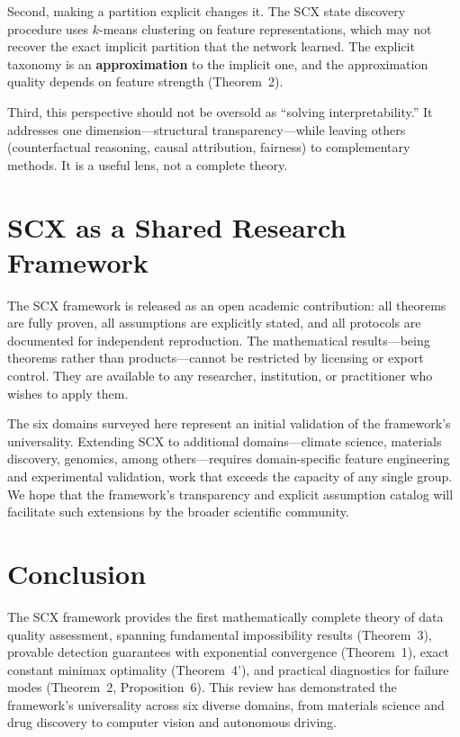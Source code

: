 \documentclass[twocolumn]{article}
\theoremstyle{definition}
\begin{document}
Second, making a partition explicit changes it. The SCX state discovery procedure uses $k$-means clustering on feature representations, which may not recover the exact implicit partition that the network learned. The explicit taxonomy is an \textbf{approximation} to the implicit one, and the approximation quality depends on feature strength (Theorem~2).

Third, this perspective should not be oversold as ``solving interpretability.'' It addresses one dimension---structural transparency---while leaving others (counterfactual reasoning, causal attribution, fairness) to complementary methods. It is a useful lens, not a complete theory.

\section{SCX as a Shared Research Framework}

The SCX framework is released as an open academic contribution: all theorems are fully proven, all assumptions are explicitly stated, and all protocols are documented for independent reproduction. The mathematical results---being theorems rather than products---cannot be restricted by licensing or export control. They are available to any researcher, institution, or practitioner who wishes to apply them.

The six domains surveyed here represent an initial validation of the framework's universality. Extending SCX to additional domains---climate science, materials discovery, genomics, among others---requires domain-specific feature engineering and experimental validation, work that exceeds the capacity of any single group. We hope that the framework's transparency and explicit assumption catalog will facilitate such extensions by the broader scientific community.

\section{Conclusion}

The SCX framework provides the first mathematically complete theory of data quality assessment, spanning fundamental impossibility results (Theorem~3), provable detection guarantees with exponential convergence (Theorem~1), exact constant minimax optimality (Theorem~4'), and practical diagnostics for failure modes (Theorem~2, Proposition~6). This review has demonstrated the framework's universality across six diverse domains, from materials science and drug discovery to computer vision and autonomous driving.
\end{document}
